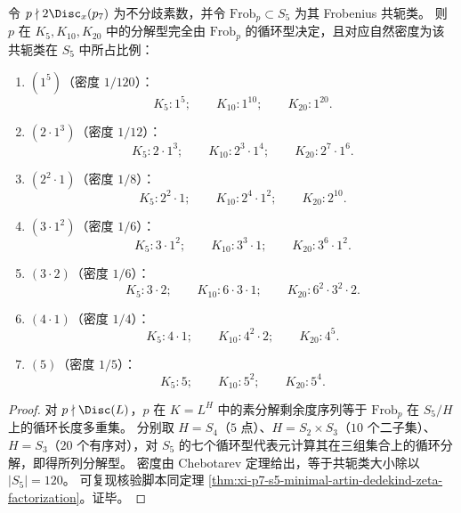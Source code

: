 \begin{theorem}\label{thm:xi-p7-s5-k5-k10-k20-splitting-type-table}
令 \(p\nmid 2\Disc_x(p_7)\) 为不分歧素数，并令 \(\mathrm{Frob}_p\subset S_5\) 为其 Frobenius 共轭类。
则 \(p\) 在 \(K_5,K_{10},K_{20}\) 中的分解型完全由 \(\mathrm{Frob}_p\) 的循环型决定，且对应自然密度为该共轭类在 \(S_5\) 中所占比例：
\begin{enumerate}
  \item \((1^5)\)（密度 \(1/120\)）：
  \[
  K_5:1^5;\qquad K_{10}:1^{10};\qquad K_{20}:1^{20}.
  \]
  \item \((2\cdot 1^3)\)（密度 \(1/12\)）：
  \[
  K_5:2\cdot 1^3;\qquad K_{10}:2^3\cdot 1^4;\qquad K_{20}:2^7\cdot 1^6.
  \]
  \item \((2^2\cdot 1)\)（密度 \(1/8\)）：
  \[
  K_5:2^2\cdot 1;\qquad K_{10}:2^4\cdot 1^2;\qquad K_{20}:2^{10}.
  \]
  \item \((3\cdot 1^2)\)（密度 \(1/6\)）：
  \[
  K_5:3\cdot 1^2;\qquad K_{10}:3^3\cdot 1;\qquad K_{20}:3^6\cdot 1^2.
  \]
  \item \((3\cdot 2)\)（密度 \(1/6\)）：
  \[
  K_5:3\cdot 2;\qquad K_{10}:6\cdot 3\cdot 1;\qquad K_{20}:6^2\cdot 3^2\cdot 2.
  \]
  \item \((4\cdot 1)\)（密度 \(1/4\)）：
  \[
  K_5:4\cdot 1;\qquad K_{10}:4^2\cdot 2;\qquad K_{20}:4^5.
  \]
  \item \((5)\)（密度 \(1/5\)）：
  \[
  K_5:5;\qquad K_{10}:5^2;\qquad K_{20}:5^4.
  \]
\end{enumerate}
\end{theorem}
\begin{proof}
对 \(p\nmid \Disc(L)\)，\(p\) 在 \(K=L^H\) 中的素分解剩余度序列等于 \(\mathrm{Frob}_p\) 在 \(S_5/H\) 上的循环长度多重集。
分别取 \(H=S_4\)（\(5\) 点）、\(H=S_2\times S_3\)（\(10\) 个二子集）、\(H=S_3\)（\(20\) 个有序对），对 \(S_5\) 的七个循环型代表元计算其在三组集合上的循环分解，即得所列分解型。
密度由 Chebotarev 定理给出，等于共轭类大小除以 \(|S_5|=120\)。
可复现核验脚本同定理 \ref{thm:xi-p7-s5-minimal-artin-dedekind-zeta-factorization}。证毕。
\end{proof}

